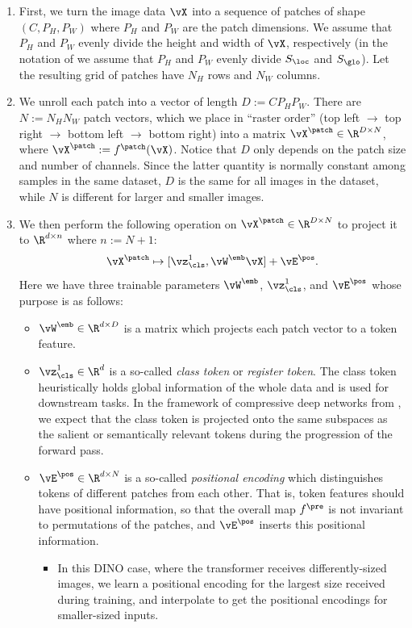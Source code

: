 \documentclass[../../book-main.tex]{subfiles}
\begin{document}
\begin{enumerate}
    \item First, we turn the image data \(\vX\) into a sequence of patches of shape \((C, P_{H}, P_{W})\) where \(P_{H}\) and \(P_{W}\) are the patch dimensions. We assume that \(P_{H}\) and \(P_{W}\) evenly divide the height and width of \(\vX\), respectively (in the notation of  we assume that \(P_{H}\) and \(P_{W}\) evenly divide \(S_{\loc}\) and \(S_{\glo}\)). Let the resulting grid of patches have \(N_{H}\) rows and \(N_{W}\) columns.
    \item We unroll each patch into a vector of length \(D := CP_{H}P_{W}\). There are \(N := N_{H}N_{W}\) patch vectors, which we place in ``raster order'' (top left \(\to\) top right \(\to\) bottom left \(\to\) bottom right) into a matrix \(\vX^{\patch} \in \R^{D \times N}\), where \(\vX^{\patch} := f^{\patch}(\vX)\). Notice that \(D\) only depends on the patch size and number of channels. Since the latter quantity is normally constant among samples in the same dataset, \(D\) is the same for all images in the dataset, while \(N\) is different for larger and smaller images.
    \item We then perform the following operation on \(\vX^{\patch} \in \R^{D \times N}\) to project it to \(\R^{d \times n}\) where \(n := N + 1\):
    \begin{equation}
        \vX^{\patch} \mapsto [\vz_{\cls}^{1}, \vW^{\emb}\vX] + \vE^{\pos}.
    \end{equation}
    Here we have three trainable parameters \(\vW^{\emb}\), \(\vz_{\cls}^{1}\), and \(\vE^{\pos}\) whose purpose is as follows:
    \begin{itemize}
        \item \(\vW^{\emb} \in \R^{d \times D}\) is a matrix which projects each patch vector to a token feature.
        \item \(\vz_{\cls}^{1} \in \R^{d}\) is a so-called \textit{class token} or \textit{register token}. The class token heuristically holds global information of the whole data and is used for downstream tasks. In the framework of compressive deep networks from , we expect that the class token is projected onto the same subspaces as the salient or semantically relevant tokens during the progression of the forward pass.
        \item \(\vE^{\pos} \in \R^{d \times N}\) is a so-called \textit{positional encoding} which distinguishes tokens of different patches from each other. That is, token features should have positional information, so that the overall map \(f^{\pre}\) is not invariant to permutations of the patches, and \(\vE^{\pos}\) inserts this positional information. 
        \begin{itemize}
            \item In this DINO case, where the transformer receives differently-sized images, we learn a positional encoding for the largest size received during training, and interpolate to get the positional encodings for smaller-sized inputs.
        \end{itemize}
    \end{itemize}
\end{enumerate}
\end{document}
